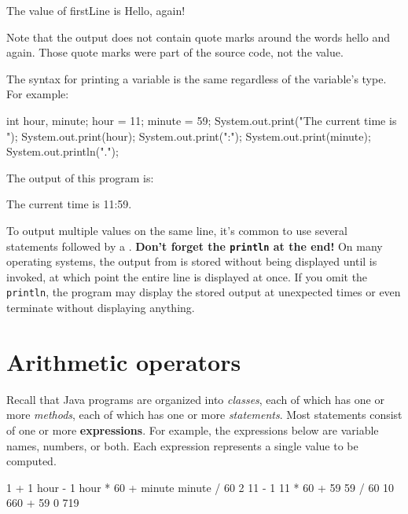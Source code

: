 \begin{stdout}
The value of firstLine is Hello, again!
\end{stdout}

Note that the output does not contain quote marks around the words hello and again.
Those quote marks were part of the source code, not the value.

The syntax for printing a variable is the same regardless of the variable's type.
For example:

\begin{code}
    int hour, minute;
    hour = 11;
    minute = 59;
    System.out.print("The current time is ");
    System.out.print(hour);
    System.out.print(":");
    System.out.print(minute);
    System.out.println(".");
\end{code}

The output of this program is:

\begin{stdout}
The current time is 11:59.
\end{stdout}

To output multiple values on the same line, it's common to use several  statements followed by a .
{\bf Don't forget the {\tt println} at the end!}
On many operating systems, the output from  is stored without being displayed until  is invoked, at which point the entire line is displayed at once.
If you omit the {\tt println}, the program may display the stored output at unexpected times or even terminate without displaying anything.


\section{Arithmetic operators}


Recall that Java programs are organized into {\em classes}, each of which has one or more {\em methods}, each of which has one or more {\em statements}.
Most statements consist of one or more {\bf expressions}.
For example, the expressions below are variable names, numbers, or both.
Each expression represents a single value to be computed.

\begin{code}
    1 + 1     hour - 1     hour * 60 + minute     minute / 60
    2         11 - 1       11 * 60 + 59           59 / 60
              10           660 + 59               0
                           719
\end{code}

